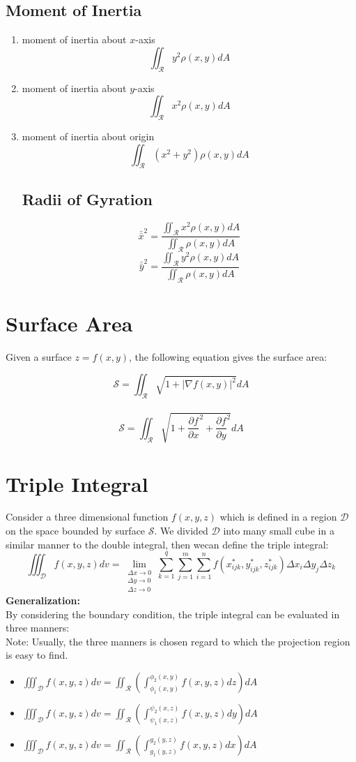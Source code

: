 \documentclass[UTF8,a4paper, 10pt, openany]{svmono}
\begin{document}
\subsection{Moment of Inertia}
\begin{enumerate}
\item moment of inertia about $x$-axis
$$\iint_{\mathcal{R}}y^2\rho (x,y)dA$$
\item moment of inertia about $y$-axis
$$\iint_{\mathcal{R}}x^2\rho (x,y)dA$$
\item moment of inertia about origin\
$$\iint_{\mathcal{R}}(x^2+y^2)\rho (x,y)dA$$
\subsection{Radii of Gyration}
$$\bar{\bar{x}}^2=\dfrac{\displaystyle\iint_{\mathcal{R}}x^2\rho (x,y)dA}{\displaystyle\iint_{\mathcal{R}}\rho (x,y)dA}$$
$$\bar{\bar{y}}^2=\dfrac{\displaystyle\iint_{\mathcal{R}}y^2\rho (x,y)dA}{\displaystyle\iint_{\mathcal{R}}\rho (x,y)dA}$$
\end{enumerate}
\section{Surface Area}
Given a surface $z=f(x,y)$, the following equation gives the surface area:
\begin{center}
$$\mathcal{S}=\iint_{\mathcal{R}}\sqrt{1+|\nabla f(x,y)|^2}dA$$\\
$$\mathcal{S}=\iint_{\mathcal{R}}\sqrt{1+\dfrac{\partial f}{\partial x}^2+\dfrac{\partial f}{\partial y}^2}dA$$
\end{center}
\section{Triple Integral}
Consider a three dimensional function $f(x,y,z)$ which is defined in a region $\mathcal{D}$ on the space bounded by surface $\mathcal{S}$. We divided $\mathcal{D}$ into many small cube in a similar manner to the double integral, then wecan define the triple integral:
$$\boxed{\iiint_{\mathcal{D}}f(x,y,z)dv=\lim_{\substack{\Delta x\to 0\\ \Delta y\to 0\\ \Delta z\to 0}}\sum_{k=1}^{q}\sum_{j=1}^{m}\sum_{i=1}^{n}f(x_{ijk}^*,y_{ijk}^*,z_{ijk}^*)\Delta x_{i}\Delta y_{j}\Delta z_{k}}$$
\textbf{Generalization:}\\
By considering the boundary condition, the triple integral can be evaluated in three manners:\\
Note: Usually, the three manners is chosen regard to which the projection region is easy to find.
\begin{itemize}
\item $\displaystyle\iiint_{\mathcal{D}}f(x,y,z)dv=\displaystyle\iint_{\mathcal{R}}\left(\int_{\phi_1(x,y)}^{\phi_2(x,y)}f(x,y,z)dz\right)dA$
\item $\displaystyle\iiint_{\mathcal{D}}f(x,y,z)dv=\displaystyle\iint_{\mathcal{R}}\left(\int_{\psi_1(x,z)}^{\psi_2(x,z)}f(x,y,z)dy\right)dA$
\item $\displaystyle\iiint_{\mathcal{D}}f(x,y,z)dv=\displaystyle\iint_{\mathcal{R}}\left(\int_{g_1(y,z)}^{g_2(y,z)}f(x,y,z)dx\right)dA$
\end{itemize}
\end{document}
